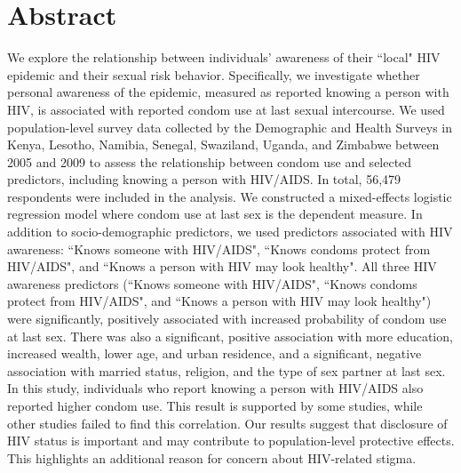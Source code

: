 \documentclass[10pt,letterpaper]{article}
\newcommand{\KnowsPWHA}{``Knows someone with HIV/AIDS"}
\newcommand{\KnowsCP}{``Knows condoms protect from HIV/AIDS"}
\newcommand{\KnowsHealthy}{``Knows a person with HIV may look healthy"}
\begin{document}
\section*{Abstract}
We explore the relationship between individuals' awareness of their  ``local" HIV epidemic and their sexual risk behavior. Specifically, we investigate whether personal awareness of the epidemic, measured as reported knowing a person with HIV, is associated with reported condom use at last sexual intercourse.  We used population-level survey data collected by the Demographic and Health Surveys in Kenya, Lesotho, Namibia, Senegal, Swaziland, Uganda, and Zimbabwe between 2005 and 2009 to assess the relationship between condom use and selected predictors, including knowing a person with HIV/AIDS. In total, 56,479 respondents were included in the analysis. We constructed a mixed-effects logistic regression model where condom use at last sex is the dependent measure. In addition to socio-demographic predictors, we used predictors associated with HIV awareness: \KnowsPWHA, \KnowsCP, and \KnowsHealthy. All three HIV awareness predictors (\KnowsPWHA, \KnowsCP, and \KnowsHealthy) were significantly, positively associated with increased probability of condom use at last sex. There was also a significant, positive association with more education, increased wealth, lower age, and urban residence, and a significant, negative association with married status, religion, and the type of sex partner at last sex.  In this study, individuals who report knowing a person with HIV/AIDS also reported higher condom use. This result is supported by some studies, while other studies failed to find this correlation. Our results suggest that disclosure of HIV status is important and may contribute to population-level protective effects. This highlights an additional reason for concern about HIV-related stigma. 






\linenumbers
\end{document}
